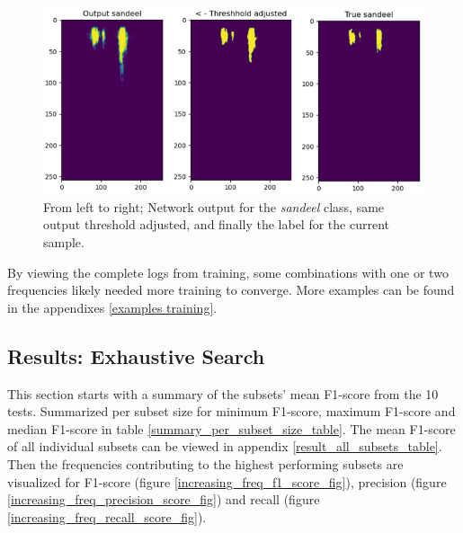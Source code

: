         \begin{figure}[H]
            \centering
            \includegraphics[scale=0.7]{figures/SANDEEL_WITH_LABEL.png}
            \caption[Example output, threshold and label]{From left to right; Network output for the \textit{sandeel} class, same output threshold adjusted, and finally the label for the current sample.}
          	\medskip 
            \label{sandeel_threshold_label}
        \end{figure}
    
    
     By viewing the complete logs from training, some combinations with one or two frequencies likely needed more training to converge. More examples can be found in the appendixes \ref{examples training}.
    

\subsection{Results: Exhaustive Search}
    This section starts with a summary of the subsets' mean F1-score from the 10 tests. Summarized per subset size for minimum F1-score, maximum F1-score and median F1-score in table \ref{summary_per_subset_size_table}. The mean F1-score of all individual subsets can be viewed in appendix \ref{result_all_subsets_table}. Then the frequencies contributing to the highest performing subsets are visualized for F1-score (figure \ref{increasing_freq_f1_score_fig}), precision (figure \ref{increasing_freq_precision_score_fig}) and recall (figure \ref{increasing_freq_recall_score_fig}).


